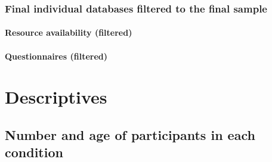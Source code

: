 \documentclass[
  bookmarksnumbered]{article}
\newenvironment{Shaded}{\begin{snugshade}}{\end{snugshade}}
\newcommand{\AttributeTok}[1]{\textcolor[rgb]{0.80,0.80,0.80}{#1}}
\newcommand{\FunctionTok}[1]{\textcolor[rgb]{0.94,0.94,0.56}{#1}}
\newcommand{\NormalTok}[1]{\textcolor[rgb]{0.80,0.80,0.80}{#1}}
\newcommand{\OtherTok}[1]{\textcolor[rgb]{0.94,0.94,0.56}{#1}}
\newcommand{\SpecialCharTok}[1]{\textcolor[rgb]{0.86,0.64,0.64}{#1}}
\newcommand{\StringTok}[1]{\textcolor[rgb]{0.80,0.58,0.58}{#1}}
\begin{document}
\subsubsection{Final individual databases filtered to the final sample}\label{final-individual-databases-filtered-to-the-final-sample}

\paragraph{Resource availability (filtered)}\label{resource-availability-filtered}

\begin{Shaded}
\end{Shaded}

\paragraph{Questionnaires (filtered)}\label{questionnaires-filtered}

\begin{Shaded}
\end{Shaded}

\section{Descriptives}\label{descriptives}

\subsection{Number and age of participants in each condition}\label{number-and-age-of-participants-in-each-condition}
\end{document}

